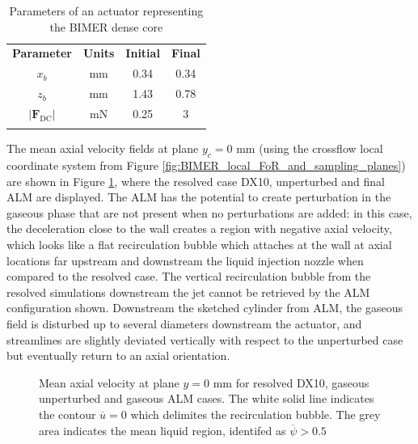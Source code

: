 \begin{table}[!h]
\centering
\caption{Parameters of an actuator representing the BIMER dense core}
\begin{tabular}{cccc}
\thickhline
\textbf{Parameter} & \textbf{Units} & \textbf{Initial} &  \textbf{Final} \\
\thickhline
$x_b$ & mm & 0.34 & 0.34 \\
$z_b$ & mm & 1.43 & 0.78 \\
$| \textbf{F}_\mathrm{DC} |$ & mN & 0.25  & 3 \\
\thickhline
\end{tabular}
\label{tab:BIMER_lgs_ALM_parameters}
\end{table}

The mean axial velocity fields at plane $y_c = 0$ mm (using the crossflow local coordinate system from Figure \ref{fig:BIMER_local_FoR_and_sampling_planes}) are shown in Figure \ref{fig:BIMER_LGS_turbulent_structures_plane_y0}, where the resolved case DX10, unperturbed and final ALM are displayed. The ALM has the potential to create perturbation in the gaseous phase that are not present when no perturbations are added: in this case, the deceleration close to the wall creates a region with negative axial velocity, which looks like a flat recirculation bubble which attaches at the wall at axial locations far upstream and downstream the liquid injection nozzle when compared to the resolved case. The vertical recirculation bubble from the resolved simulations downstream the jet cannot be retrieved by the ALM configuration shown. Downstream the sketched cylinder from ALM, the gaseous field is disturbed up to several diameters downstream the actuator, and streamlines are slightly deviated vertically with respect to the unperturbed case but eventually return to an axial orientation.



\begin{figure}[ht]
\centering
\caption[Mean axial velocity at plane $y = 0$ mm]{Mean axial velocity at plane $y = 0$ mm for resolved DX10, gaseous unperturbed and gaseous ALM cases. The white solid line indicates the contour $\overline{u} = 0$ which delimites the recirculation bubble. The grey area indicates the mean liquid region, identifed as $\overline{\psi} > 0.5$}
\label{fig:BIMER_LGS_turbulent_structures_plane_y0}
\end{figure}

